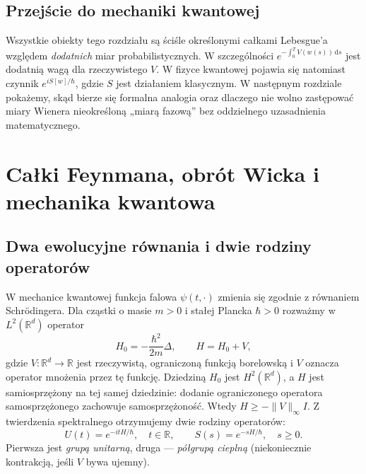 \documentclass[11pt,a4paper,oneside]{report}
\numberwithin{equation}{chapter}
\theoremstyle{plain}
\theoremstyle{definition}
\theoremstyle{remark}
\newcommand{\R}{\mathbb{R}}
\newcommand{\dd}{\mathrm{d}}
\begin{document}
\section{Przejście do mechaniki kwantowej}\label{sec:volIII:15:09}

Wszystkie obiekty tego rozdziału są ściśle określonymi
całkami Lebesgue'a względem \emph{dodatnich} miar
probabilistycznych. W szczególności
$e^{-\int_0^T V(w(s))\,\dd s}$ jest dodatnią wagą dla
rzeczywistego $V$. W fizyce kwantowej pojawia się natomiast
czynnik $e^{iS[w]/\hbar}$, gdzie $S$ jest działaniem
klasycznym. W następnym rozdziale pokażemy, skąd bierze się
formalna analogia oraz dlaczego nie wolno zastępować
miary Wienera nieokreśloną „miarą fazową” bez oddzielnego
uzasadnienia matematycznego.


\chapter{Całki Feynmana, obrót Wicka i mechanika kwantowa}
\label{chap:volIII:16}
\par\smallskip{}\par\smallskip

\label{ch:feynman-path}

\section{Dwa ewolucyjne równania i dwie rodziny operatorów}\label{sec:volIII:16:01}

W mechanice kwantowej funkcja falowa $\psi(t,\cdot)$ zmienia się
zgodnie z równaniem Schrödingera. Dla cząstki o masie $m>0$
i stałej Plancka $\hbar>0$ rozważmy w $L^2(\R^d)$
operator
\[
 H_0=-\frac{\hbar^2}{2m}\Delta,
 \qquad H=H_0+V,
\tag{16.1}\label{eq:QM-H}
\]
gdzie $V:\R^d\to\R$ jest rzeczywistą, ograniczoną funkcją
borelowską i $V$ oznacza operator mnożenia przez tę funkcję.
Dziedziną $H_0$ jest $H^2(\R^d)$, a $H$ jest
samiosprzężony na tej samej dziedzinie: dodanie ograniczonego
operatora samosprzężonego zachowuje samosprzężoność.
Wtedy $H\ge-\|V\|_\infty I$. Z twierdzenia spektralnego
otrzymujemy dwie rodziny operatorów:
\[
 U(t)=e^{-itH/\hbar},\quad t\in\R,\qquad
 S(s)=e^{-sH/\hbar},\quad s\ge0.
\tag{16.2}\label{eq:unitary-euclidean}
\]
Pierwsza jest \emph{grupą unitarną}, druga --- \emph{półgrupą
cieplną} (niekoniecznie kontrakcją, jeśli $V$ bywa ujemny).
\end{document}
